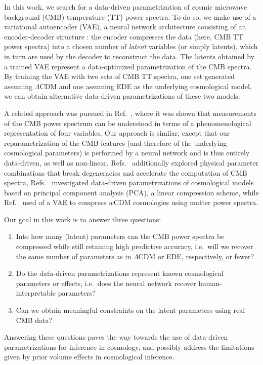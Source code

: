 \documentclass[aps, prd, reprint, superscriptaddress, nofootinbib, bibnotes]{revtex4-2}
\begin{document}
In this work, we search for a data-driven parametrization of cosmic microwave background (CMB) temperature (TT) power spectra.
To do so, we make use of a variational autoencoder (VAE), a neural network architecture consisting of an encoder-decoder structure \cite{KingmaWelling2013, Rezende2014}: the encoder compresses the data (here, CMB TT power spectra) into a chosen number of \textit{latent} variables (or simply latents), which in turn are used by the decoder to reconstruct the data. The latents obtained by a trained VAE represent a data-optimized parametrization of the CMB spectra. By training the VAE with two sets of CMB TT spectra, one set generated assuming $\Lambda$CDM and one assuming EDE as the underlying cosmological model, we can obtain alternative data-driven parametrizations of these two models. 

A related approach was pursued in Ref.~\cite{Hu_2001}, where it was shown that measurements of the CMB power spectrum can be understood in terms of a phenomenological representation of four variables. Our approach is similar, except that our reparametrization of the CMB features (and therefore of the underlying cosmological parameters) is performed by a neural network and is thus entirely data-driven, as well as non-linear. Refs.~\cite{Kosowsky:2002zt, Jimenez:2004ct} additionally explored physical parameter combinations that break degeneracies and accelerate the computation of CMB spectra, Refs.~\cite{Huterer:2002hy, Crittenden:2005wj, Zhao:2009fn, Hojjati:2011xd, Asaba:2013xql} investigated data-driven parametrizations of cosmological models based on principal component analysis (PCA), a linear compression scheme, while Ref.~\cite{Piras:2023lid} used of a VAE to compress $w$CDM cosmologies using matter power spectra. 

Our goal in this work is to answer three questions:
\begin{enumerate}
    \item Into how many (latent) parameters can the CMB power spectra be compressed while still retaining high predictive accuracy, i.e.\ will we recover the same number of parameters as in $\Lambda$CDM or EDE, respectively, or fewer? 
    \item Do the data-driven parametrizations represent known cosmological parameters or effects, i.e.\ does the neural network recover human-interpretable parameters?
    \item Can we obtain meaningful constraints on the latent parameters using real CMB data?
\end{enumerate} 
Answering these questions paves the way towards the use of data-driven parametrizations for inference in cosmology, and possibly address the limitations given by prior volume effects in cosmological inference. 
\end{document}
